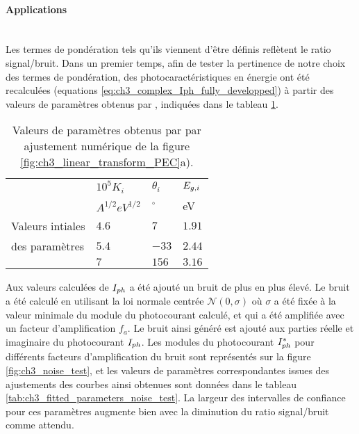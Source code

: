 \begin{refsection}
    \paragraph{Applications}\mbox{}\\
    Les termes de pondération tels qu'ils viennent d'être définis reflètent le ratio signal/bruit. Dans un premier temps,
    afin de tester la pertinence de notre
    choix des termes de pondération, des photocaractéristiques en énergie ont été recalculées 
    (equations \ref{eq:ch3_complex_Iph_fully_developped}) à partir des valeurs de paramètres obtenus par
    \citet{Petit2013}, indiquées dans le tableau \ref{tab:ch3_initial_values_noise}.
    
    \begin{table}[H]
        \centering
        \begin{tabular}{p{}|%
                        p{}%
                        p{}%
                        p{}}
            \toprule
            & $10^5K_i$ & $\theta _i$ & $E_{g,i}$ \\ 
            & $A^{1/2} eV^{1/2}$ & $^{\circ}$ & eV \\ \midrule
            Valeurs intiales & $4.6$ & $7$ & $1.91$ \\
            des paramètres & $5.4$ & $-33$ & $2.44$ \\
            & $7$ & $156$ & $3.16$\\  
            \bottomrule
        \end{tabular}  
        \caption[Valeurs de paramètres obtenus par ajustement numérique de la figure
        \ref{fig:ch3_linear_transform_PEC}a).]
        {Valeurs de paramètres obtenus par \citet{Petit2013} par ajustement numérique de la figure
        \ref{fig:ch3_linear_transform_PEC}a).}
        \label{tab:ch3_initial_values_noise}
    \end{table}    

    Aux valeurs calculées de $I_{ph}$ a été ajouté un bruit de plus en plus élevé. 
    Le bruit a été calculé en utilisant la loi normale centrée $\mathcal{N}(0, \sigma)$ où
    $\sigma$ a été fixée à la valeur minimale du module du photocourant calculé, et qui a été amplifiée avec un
    facteur d'amplification $f_a$. Le bruit ainsi généré est ajouté aux parties réelle et imaginaire du photocourant
    $I_{ph}$.    
    Les modules du
    photocourant $I_{ph}^{\ast}$ pour différents facteurs d'amplification du bruit sont représentés sur la figure
    \ref{fig:ch3_noise_test}, et les valeurs de paramètres correspondantes issues des ajustements des courbes ainsi
    obtenues sont données dans le tableau
    \ref{tab:ch3_fitted_parameters_noise_test}.
    La largeur des intervalles de confiance pour ces paramètres augmente bien avec la diminution du
    ratio signal/bruit comme attendu. 


\end{refsection}
